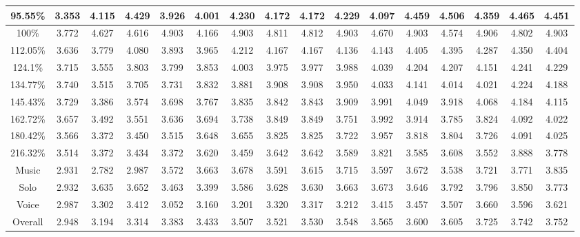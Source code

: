 \begin{table*}[ht]
\begin{ruledtabular}
\begin{tabular}{cccccccccccccccc}
\hline
95.55\% & 3.353 & 4.115 & 4.429 & 3.926 & 4.001 & 4.230 & 4.172 & 4.172 & 4.229 & 4.097 & 4.459 & 4.506 & 4.359 & 4.465 & 4.451 \\
\hline
100\% & 3.772 & 4.627 & 4.616 & 4.903 & 4.166 & 4.903 & 4.811 & 4.812 & 4.903 & 4.670 & 4.903 & 4.574 & 4.906 & 4.802 & 4.903 \\
\hline
112.05\% & 3.636 & 3.779 & 4.080 & 3.893 & 3.965 & 4.212 & 4.167 & 4.167 & 4.136 & 4.143 & 4.405 & 4.395 & 4.287 & 4.350 & 4.404 \\
\hline
124.1\% & 3.715 & 3.555 & 3.803 & 3.799 & 3.853 & 4.003 & 3.975 & 3.977 & 3.988 & 4.039 & 4.204 & 4.207 & 4.151 & 4.241 & 4.229 \\
\hline
134.77\% & 3.740 & 3.515 & 3.705 & 3.731 & 3.832 & 3.881 & 3.908 & 3.908 & 3.950 & 4.033 & 4.141 & 4.014 & 4.021 & 4.224 & 4.188 \\
\hline
145.43\% & 3.729 & 3.386 & 3.574 & 3.698 & 3.767 & 3.835 & 3.842 & 3.843 & 3.909 & 3.991 & 4.049 & 3.918 & 4.068 & 4.184 & 4.115 \\
\hline
162.72\% & 3.657 & 3.492 & 3.551 & 3.636 & 3.694 & 3.738 & 3.849 & 3.849 & 3.751 & 3.992 & 3.914 & 3.785 & 3.824 & 4.092 & 4.022 \\
\hline
180.42\% & 3.566 & 3.372 & 3.450 & 3.515 & 3.648 & 3.655 & 3.825 & 3.825 & 3.722 & 3.957 & 3.818 & 3.804 & 3.726 & 4.091 & 4.025 \\
\hline
216.32\% & 3.514 & 3.372 & 3.434 & 3.372 & 3.620 & 3.459 & 3.642 & 3.642 & 3.589 & 3.821 & 3.585 & 3.608 & 3.552 & 3.888 & 3.778 \\
\hline
Music & 2.931 & 2.782 & 2.987 & 3.572 & 3.663 & 3.678 & 3.591 & 3.615 & 3.715 & 3.597 & 3.672 & 3.538 & 3.721 & 3.771 & 3.835 \\
\hline
Solo & 2.932 & 3.635 & 3.652 & 3.463 & 3.399 & 3.586 & 3.628 & 3.630 & 3.663 & 3.673 & 3.646 & 3.792 & 3.796 & 3.850 & 3.773 \\
\hline
Voice & 2.987 & 3.302 & 3.412 & 3.052 & 3.160 & 3.201 & 3.320 & 3.317 & 3.212 & 3.415 & 3.457 & 3.507 & 3.660 & 3.596 & 3.621 \\
\hline
Overall & 2.948 & 3.194 & 3.314 & 3.383 & 3.433 & 3.507 & 3.521 & 3.530 & 3.548 & 3.565 & 3.600 & 3.605 & 3.725 & 3.742 & 3.752 \\
\end{tabular}
\end{ruledtabular}
\label{tab:Eval}
\end{table*}
